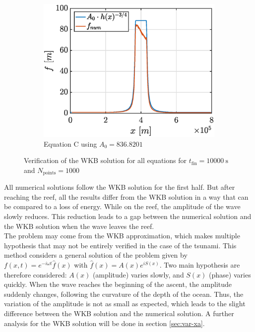 \documentclass[a4paper,12pt,twoside]{article}
\begin{document}
\begin{figure}[h]
\begin{subfigure}{0.45\textwidth}
          \label{fig:tsunami-amp-B}
        \end{subfigure}\\
        \centering
        \begin{subfigure}{0.45\textwidth}
          \centering
          \includegraphics[width=\textwidth]{graphs/tsunami_amp_C.eps}
          \caption{Equation C using $A_0 = \num{836.8201}$}
          \label{fig:tsunami-amp-C}
        \end{subfigure}
        \caption{Verification of the WKB solution for all equations for $t_\text{fin} = \SI{10000}{\s}$ and $N_\text{points} = \num{1000}$}
        \label{fig:tsunami-amp}
      \end{figure}

      All numerical solutions follow the WKB solution for the first half.
      But after reaching the reef, all the results differ from the WKB solution in a way that can be compared to a loss of energy.
      While on the reef, the amplitude of the wave slowly reduces.
      This reduction leads to a gap between the numerical solution and the WKB solution when the wave leaves the reef.\\

      The problem may come from the WKB approximation, which makes multiple hypothesis that may not be entirely verified in the case of the tsunami.
      This method considers a general solution of the problem given by $f(x,t)=e^{-i\omega t}\hat{f}(x)$ with $\hat{f}(x) = A(x)e^{iS(x)}$.
      Two main hypothesis are therefore considered: $A(x)$ (amplitude) varies slowly, and $S(x)$ (phase) varies quickly.
      When the wave reaches the beginning of the ascent, the amplitude suddenly changes, following the curvature of the depth of the ocean.
      Thus, the variation of the amplitude is not as small as expected, which leads to the slight difference between the WKB solution and the numerical solution.
      A further analysis for the WKB solution will be done in section \ref{sec:var-xa}.
\end{document}
